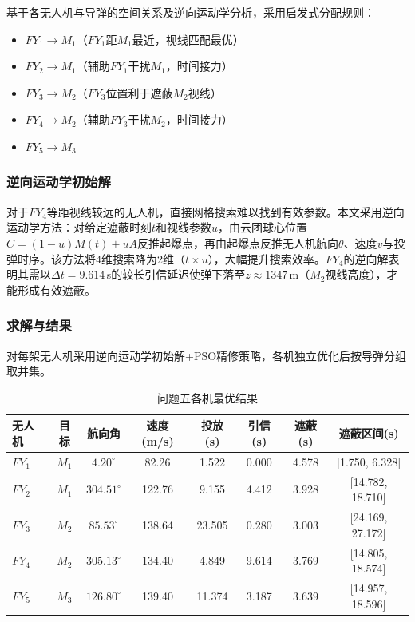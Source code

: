 \documentclass[12pt,a4paper]{article}
\begin{document}
基于各无人机与导弹的空间关系及逆向运动学分析，采用启发式分配规则：
\begin{itemize}[nosep]
  \item $FY_1 \to M_1$（$FY_1$距$M_1$最近，视线匹配最优）
  \item $FY_2 \to M_1$（辅助$FY_1$干扰$M_1$，时间接力）
  \item $FY_3 \to M_2$（$FY_3$位置利于遮蔽$M_2$视线）
  \item $FY_4 \to M_2$（辅助$FY_3$干扰$M_2$，时间接力）
  \item $FY_5 \to M_3$
\end{itemize}

\subsubsection{逆向运动学初始解}

对于$FY_4$等距视线较远的无人机，直接网格搜索难以找到有效参数。本文采用逆向运动学方法：对给定遮蔽时刻$t$和视线参数$u$，由云团球心位置$C = (1-u)M(t) + uA$反推起爆点，再由起爆点反推无人机航向$\theta$、速度$v$与投弹时序。该方法将4维搜索降为2维（$t \times u$），大幅提升搜索效率。$FY_4$的逆向解表明其需以$\Delta t = 9.614$\,s的较长引信延迟使弹下落至$z \approx 1347$\,m（$M_2$视线高度），才能形成有效遮蔽。

\subsubsection{求解与结果}

对每架无人机采用逆向运动学初始解+PSO精修策略，各机独立优化后按导弹分组取并集。

\begin{table}[H]
\centering
\caption{问题五各机最优结果}
\begin{tabular}{lccccccc}
\toprule
无人机 & 目标 & 航向角 & 速度(m/s) & 投放(s) & 引信(s) & 遮蔽(s) & 遮蔽区间(s) \\
\midrule
$FY_1$ & $M_1$ & $4.20^\circ$ & 82.26 & 1.522 & 0.000 & 4.578 & [1.750, 6.328] \\
$FY_2$ & $M_1$ & $304.51^\circ$ & 122.76 & 9.155 & 4.412 & 3.928 & [14.782, 18.710] \\
$FY_3$ & $M_2$ & $85.53^\circ$ & 138.64 & 23.505 & 0.280 & 3.003 & [24.169, 27.172] \\
$FY_4$ & $M_2$ & $305.13^\circ$ & 134.40 & 4.849 & 9.614 & 3.769 & [14.805, 18.574] \\
$FY_5$ & $M_3$ & $126.80^\circ$ & 139.40 & 11.374 & 3.187 & 3.639 & [14.957, 18.596] \\
\bottomrule
\end{tabular}
\end{table}
\end{document}
